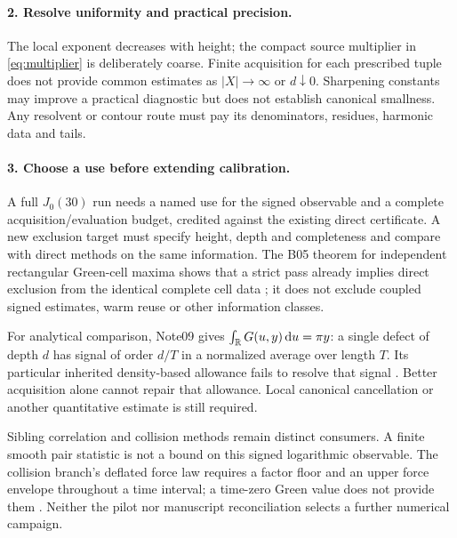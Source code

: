 \paragraph{2. Resolve uniformity and practical precision.}
The local exponent decreases with height; the compact
source multiplier in \eqref{eq:multiplier} is deliberately coarse.
Finite acquisition for each prescribed tuple does not provide common
estimates as \(|X|\to\infty\) or \(d\downarrow0\).
Sharpening constants may improve a practical diagnostic but does not
establish canonical smallness. Any resolvent or contour route must
pay its denominators, residues, harmonic data and tails.

\paragraph{3. Choose a use before extending calibration.}
A full \(J_0(30)\) run needs a named use for the signed observable
and a complete acquisition/evaluation budget, credited against the
existing direct certificate. A new exclusion target must specify
height, depth and completeness and compare with direct methods on
the same information. The B05 theorem for independent rectangular
Green-cell maxima shows that a strict pass already implies direct
exclusion from the identical complete cell data
\cite{OGDeflation,OGDeflationAssessment}; it does not exclude coupled
signed estimates, warm reuse or other information classes.

For analytical comparison, Note09 gives
\(\int_{\mathbb R}G(u,y)\,\mathrm d u=\pi y\): a single defect of depth \(d\)
has signal of order \(d/T\) in a normalized average over length \(T\).
Its particular inherited density-based allowance fails to resolve
that signal \cite{OGResolution}. Better acquisition alone cannot
repair that allowance. Local canonical cancellation or another
quantitative estimate is still required.

Sibling correlation and collision methods remain distinct consumers.
A finite smooth pair statistic is not a bound on this signed
logarithmic observable. The collision branch's deflated force law
requires a factor floor and an upper force envelope throughout a
time interval; a time-zero Green value does not provide them
\cite{OGSiblingReuse}. Neither the pilot nor manuscript reconciliation
selects a further numerical campaign.

